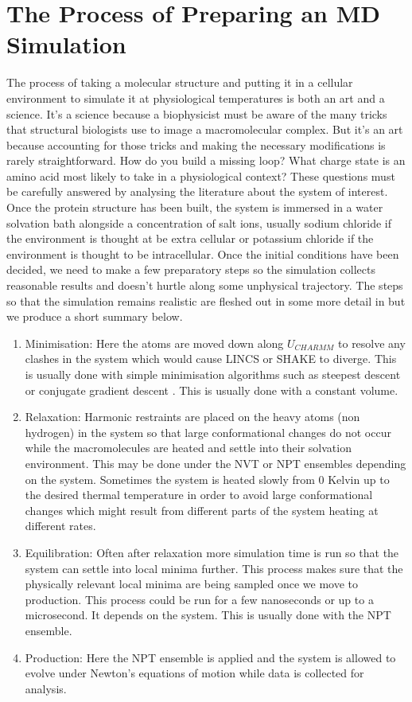 	\section{The Process of Preparing an MD Simulation}
	The process of taking a molecular structure and putting it in a cellular environment to simulate it at physiological temperatures is both an art and a science. It's a science because a biophysicist must be aware of the many tricks that structural biologists use to image a macromolecular complex. But it's an art because accounting for those tricks and making the necessary modifications is rarely straightforward. How do you build a missing loop? What charge state is an amino acid most likely to take in a physiological context? These questions must be carefully answered by analysing the literature about the system of interest. Once the protein structure has been built, the system is immersed in a water solvation bath alongside a concentration of salt ions, usually sodium chloride if the environment is thought at be extra cellular or potassium chloride if the environment is thought to be intracellular. Once the initial conditions have been decided, we need to make a few preparatory steps so the simulation collects reasonable results and doesn't hurtle along some unphysical trajectory. The steps so that the simulation remains realistic are fleshed out in some more detail in \cite{braun2019} but we produce a short summary below.

	\begin{enumerate}
		\item Minimisation: Here the atoms are moved down along $U_{CHARMM}$ to resolve any clashes  in the system which would cause LINCS or SHAKE to diverge. This is usually done with simple minimisation algorithms such as steepest descent or conjugate gradient descent \cite{leach2001}. This is usually done with a constant volume. 
	\item Relaxation: Harmonic restraints are placed on the heavy atoms (non hydrogen) in the system so that large conformational changes do not occur while the macromolecules are heated and settle into their solvation environment. This may be done under the NVT or NPT ensembles depending on the system. Sometimes the system is heated slowly from 0 Kelvin up to the desired thermal temperature in order to avoid large conformational changes which might result from different parts of the system heating at different rates. 
\item Equilibration: Often after relaxation more simulation time is run so that the system can settle into local minima further. This process makes sure that the physically relevant local minima are being sampled once we move to production. This process could be run for a few nanoseconds or up to a microsecond. It depends on the system. This is usually done with the NPT ensemble.
\item Production: Here the NPT ensemble is applied and the system is allowed to evolve under Newton's equations of motion while data is collected for analysis.
\end{enumerate}


